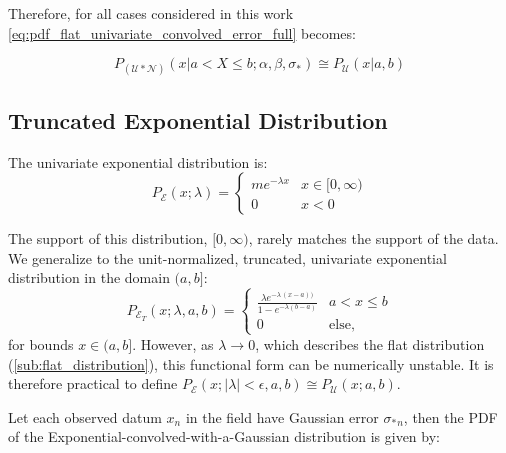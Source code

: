 \documentclass[twocolumn]{aastex631}
\newcommand{\mcal}[1]{\mathcal{#1}}
\newcommand{\pdf}{P}
\newcommand{\Exp}[1]{e^{#1}}
\newcommand{\sigobs}{{\sigma_*}}
\begin{document}
        Therefore, for all cases considered in this work \eqref{eq:pdf_flat_univariate_convolved_error_full} becomes:

        \begin{equation}\label{eq:pdf_flat_univariate_convolved_error}
            \pdf_{(\mcal{U}*\mcal{N})}(x | a < X \leq b; \alpha, \beta, \sigobs) \cong P_{\mcal{U}}(x|a,b)
        \end{equation}
        

    \vspace{10pt}
    \subsection{Truncated Exponential Distribution} \label{sub:exponential_distribution}
    
        The univariate exponential distribution is:
        \begin{equation} \label{eq:pdf_exp_univariate}
            \pdf_{\mcal{E}}(x; \lambda) = \begin{cases}
                m \Exp{-\lambda x} & x \in [0, \infty) \\
                0 & x < 0
            \end{cases}
        \end{equation}
    
        The support of this distribution, $[0, \infty)$, rarely matches the support of the data. We generalize to the unit-normalized, truncated, univariate exponential distribution in the domain $(a, b]$:
        \begin{equation} \label{eq:pdf_truncexp_univariate}
            \pdf_{\mcal{E}_T}(x; \lambda, a, b) = \begin{cases}
                \frac{\lambda \Exp{-\lambda \, (x - a))}}{1 - \Exp{-\lambda(b - a)}} & a < x \leq b \\
                0 & \text{else},
            \end{cases}
        \end{equation}
        for bounds $x \in (a,b]$. However, as $\lambda \rightarrow 0$, which describes the flat distribution (\autoref{sub:flat_distribution}), this functional form can be numerically unstable. It is therefore practical to define $\pdf_{\mcal{E}}(x; |\lambda| < \epsilon, a, b) \cong P_{\mcal{U}}(x; a,b)$.

        Let each observed datum $x_n$ in the field have Gaussian error $\sigobs_n$,
        then the PDF of the Exponential-convolved-with-a-Gaussian distribution is given by:
\end{document}
